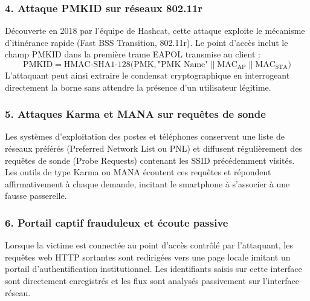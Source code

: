\documentclass[a4paper,11pt]{article}
\begin{document}
\subsubsection{4. Attaque PMKID sur réseaux 802.11r}
Découverte en 2018 par l'équipe de Hashcat, cette attaque exploite le mécanisme d'itinérance rapide (Fast BSS Transition, 802.11r). Le point d'accès inclut le champ PMKID dans la première trame EAPOL transmise au client :
\begin{equation}
\text{PMKID} = \text{HMAC-SHA1-128}\Big(\text{PMK}, \text{"PMK Name"} \parallel \text{MAC}_{\text{AP}} \parallel \text{MAC}_{\text{STA}}\Big)
\end{equation}
L'attaquant peut ainsi extraire le condensat cryptographique en interrogeant directement la borne sans attendre la présence d'un utilisateur légitime.

\subsubsection{5. Attaques Karma et MANA sur requêtes de sonde}
Les systèmes d'exploitation des postes et téléphones conservent une liste de réseaux préférés (Preferred Network List ou PNL) et diffusent régulièrement des requêtes de sonde (Probe Requests) contenant les SSID précédemment visités. Les outils de type Karma ou MANA écoutent ces requêtes et répondent affirmativement à chaque demande, incitant le smartphone à s'associer à une fausse passerelle.

\subsubsection{6. Portail captif frauduleux et écoute passive}
Lorsque la victime est connectée au point d'accès contrôlé par l'attaquant, les requêtes web HTTP sortantes sont redirigées vers une page locale imitant un portail d'authentification institutionnel. Les identifiants saisis sur cette interface sont directement enregistrés et les flux sont analysés passivement sur l'interface réseau.
\end{document}
